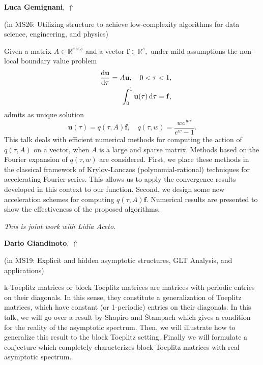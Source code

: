 \documentclass[ILAS2025-program.tex]{subfiles}
\begin{document}
\hypertarget{down0026}{}\begin{ilasabstract}
    
\textbf{Luca Gemignani},  \hfill \hyperlink{up0026}{$\Uparrow$}
    
    
(in {\color{mstitle}MS26: Utilizing structure to achieve low-complexity algorithms for data science, engineering, and physics})
        
\mtskip
    Given a matrix $A\in \mathbb R^{s\times s}$ and a  vector $\mathbf {f} \in \mathbb{ R } ^s,$ under mild assumptions the non-local boundary value problem 
\begin{eqnarray*}
    &&\odv{\mathbf{u}}{\tau} = A \mathbf{u}, \quad 0<\tau<1,   \label{l1} \\
  &&\displaystyle \int_0^1 \mathbf{u}(\tau) \,\mathrm{d}\tau = \mathbf {f}, \label{l2}
\end{eqnarray*}
admits as unique solution
\[
 \mathbf{u}(\tau)= q(\tau,A) \mathbf {f}, \quad q(\tau,w)= \frac{w e^{w\tau}}{e^w -1}.
 \]
This talk  deals with efficient numerical methods for computing the action
of $q(\tau,A)$ on a vector,  when $A$ is a large and
  sparse matrix.  Methods based on the Fourier expansion of $q(\tau,w)$
are considered. First, we place
these methods in the classical framework of Krylov-Lanczos
(polynomial-rational) techniques for accelerating Fourier series.
This allows us to apply the convergence results developed in this
context to our function. Second, we design some  new acceleration schemes for computing $q(\tau,A) \mathbf {f}$. Numerical results are presented to show the effectiveness of
the proposed algorithms.


\emph{This is joint work with Lidia Aceto.}
\end{ilasabstract}
    

\hypertarget{down0256}{}\begin{ilasabstract}
    
\textbf{Dario Giandinoto},  \hfill \hyperlink{up0256}{$\Uparrow$}
    
    
(in {\color{mstitle}MS19: Explicit and hidden asymptotic structures, GLT Analysis, and applications})
        
\mtskip
    k-Toeplitz matrices or block Toeplitz matrices are matrices with periodic entries on their diagonals. In this sense, they constitute a generalization of Toeplitz matrices, which have constant (or 1-periodic) entries on their diagonals. In this talk, we will go over a result by Shapiro and Štampach which gives a condition for the reality of the asymptotic spectrum. Then, we will illustrate how to generalize this result to the block Toeplitz setting. Finally we will formulate a conjecture which completely characterizes block Toeplitz matrices with real asymptotic spectrum.

\end{ilasabstract}
    
\end{document}
